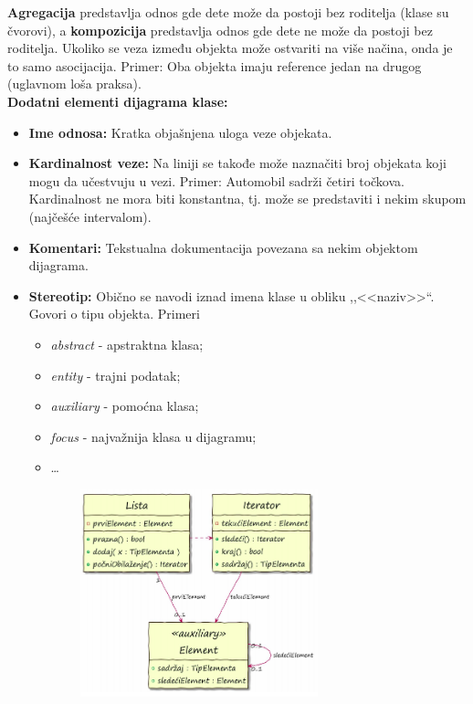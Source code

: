 \documentclass[a4paper]{article}
\begin{document}
  \textbf{Agregacija} predstavlja odnos gde dete može da postoji bez roditelja (klase su čvorovi), 
  a \textbf{kompozicija} predstavlja odnos gde dete ne može da postoji bez roditelja.
  \indent Ukoliko se veza između objekta može ostvariti na više načina, onda je to
  samo asocijacija. Primer: Oba objekta imaju reference jedan na drugog 
  (uglavnom loša praksa).\\
  \noindent \textbf{Dodatni elementi dijagrama klase:}
  \begin{itemize}
    \item \textbf{Ime odnosa:} Kratka objašnjena uloga veze objekata.
    \item \textbf{Kardinalnost veze:} Na liniji se takođe može naznačiti broj objekata koji
          mogu da učestvuju u vezi.
          Primer: Automobil sadrži četiri točkova. Kardinalnost ne mora 
          biti konstantna, tj. može se predstaviti i nekim skupom (najčešće intervalom).
    \item \textbf{Komentari:} Tekstualna dokumentacija povezana sa nekim objektom dijagrama.
    \item \textbf{Stereotip:} Obično se navodi iznad imena klase u obliku ,,<<naziv>>``. 
          Govori o tipu objekta. Primeri
          \begin{itemize}
            \item \textit{abstract} - apstraktna klasa;
            \item \textit{entity} - trajni podatak;
            \item \textit{auxiliary} - pomoćna klasa;
            \item \textit{focus} - najvažnija klasa u dijagramu;
            \item \dots
          \end{itemize}
  \end{itemize}
  \begin{figure}[H]
    \begin{center}
        \includegraphics[width=90mm,height=60mm]{Slike/klasa_lista.png}
    \end{center}
  \end{figure} 
\end{document}
